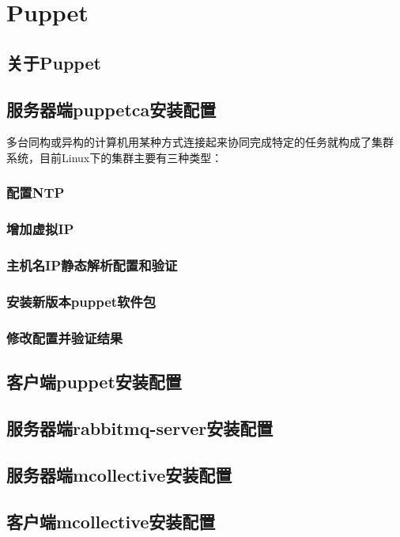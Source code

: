 \chapter{Puppet}

\section{关于Puppet}

\section{服务器端puppetca安装配置}

多台同构或异构的计算机用某种方式连接起来协同完成特定的任务就构成了集群
系统，目前Linux下的集群主要有三种类型：

\subsection{配置NTP}
\label{sec:NTPconf}

\subsection{增加虚拟IP}
\label{sec:AddVIP}

\subsection{主机名IP静态解析配置和验证}
\label{sec:StaticIP}

\subsection{安装新版本puppet软件包}
\label{sec:InstallNewPuppet}

\subsection{修改配置并验证结果}
\label{sec:ModifyConfVerify}

\section{客户端puppet安装配置}

\section{服务器端rabbitmq-server安装配置}

\section{服务器端mcollective安装配置}

\section{客户端mcollective安装配置}


